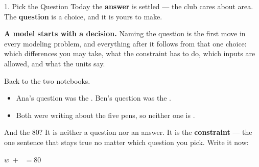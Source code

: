 \documentclass[10pt]{article}
\begin{document}
\begin{notesbox}{1. Pick the Question}
\medskip
Today the \textbf{answer} is settled --- the club cares about area. The
\textbf{question} is a choice, and it is yours to make.

\smallskip
\begin{center}
\begin{tcolorbox}[colback=lilac, colframe=plum, boxrule=0.8pt, arc=2mm,
    left=3mm, right=3mm, top=2mm, bottom=2mm, width=0.94\linewidth]
\textbf{A model starts with a decision.} Naming the question is the first move
in every modeling problem, and everything after it follows from that one
choice: which differences you may take, what the constraint has to do, which
inputs are allowed, and what the units say.
\end{tcolorbox}
\end{center}

\medskip
Back to the two notebooks.

\smallskip
\begin{itemize}[itemsep=4pt]
  \item Ana's question was the . \quad Ben's question was the
        .
  \item Both were writing about the  five pens, so neither one is
        .
\end{itemize}

\medskip
And the 80? It is neither a question nor an answer. It is the
\textbf{constraint} --- the one sentence that stays true no matter which
question you pick. Write it now:

\begin{center}
 $w \; + \;$ \ans{$\ell$} $= 80$
\end{center}
\end{notesbox}

\vspace{0.1in}
\end{document}
